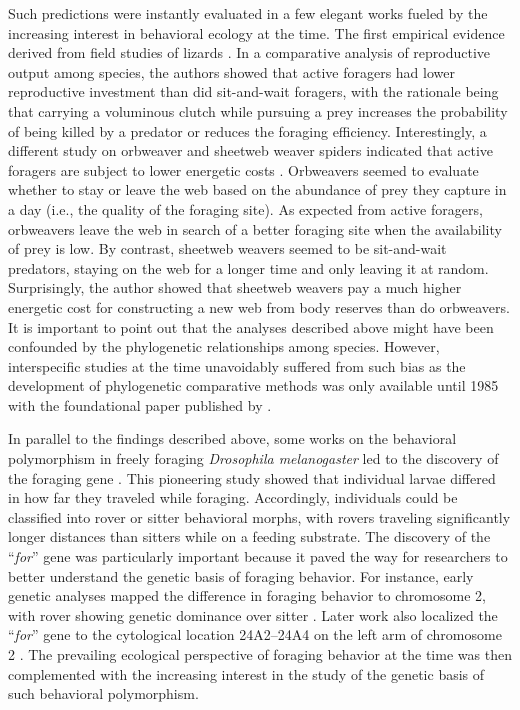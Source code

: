 \documentclass[12pt]{article}
\begin{document}
Such predictions were instantly evaluated in a few elegant works fueled by the increasing interest in behavioral ecology at the time. The first empirical evidence derived from field studies of lizards \citep{vitt1978body,vitt1982ecological}. In a comparative analysis of reproductive output among species, the authors showed that active foragers had lower reproductive investment than did sit-and-wait foragers, with the rationale being that carrying a voluminous clutch while pursuing a prey increases the probability of being killed by a predator or reduces the foraging efficiency. Interestingly, a different study on orbweaver and sheetweb weaver spiders indicated that active foragers are subject to lower energetic costs \citep{janetos1982foraging}. Orbweavers seemed to evaluate whether to stay or leave the web based on the abundance of prey they capture in a day (i.e., the quality of the foraging site). As expected from active foragers, orbweavers leave the web in search of a better foraging site when the availability of prey is low. By contrast, sheetweb weavers seemed to be sit-and-wait predators, staying on the web for a longer time and only leaving it at random. Surprisingly, the author showed that sheetweb weavers pay a much higher energetic cost for constructing a new web from body reserves than do orbweavers. It is important to point out that the analyses described above might have been confounded by the phylogenetic relationships among species. However, interspecific studies at the time unavoidably suffered from such bias as the development of phylogenetic comparative methods was only available until 1985 with the foundational paper published by \cite{felsenstein1985phylogenies}.

\vspace{20px}

In parallel to the findings described above, some works on the behavioral polymorphism in freely foraging \textit{Drosophila melanogaster} led to the discovery of the foraging gene \citep[``\textit{for}'',][]{sokolowski1980foraging}. This pioneering study showed that individual larvae differed in how far they traveled while foraging. Accordingly, individuals could be classified into rover or sitter behavioral morphs, with rovers traveling significantly longer distances than sitters while on a feeding substrate. The discovery of the ``\textit{for}'' gene was particularly important because it paved the way for researchers to better understand the genetic basis of foraging behavior. For instance, early genetic analyses mapped the difference in foraging behavior to chromosome 2, with rover showing genetic dominance over sitter \citep{de1987heredity}. Later work also localized the ``\textit{for}'' gene to the cytological location 24A2–24A4 on the left arm of chromosome 2 \citep{de1989genetic}. The prevailing ecological perspective of foraging behavior at the time was then complemented with the increasing interest in the study of the genetic basis of such behavioral polymorphism.
\end{document}
